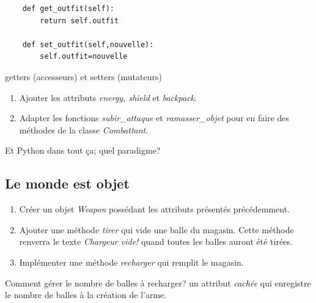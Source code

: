 \documentclass[a4paper,11pt]{article}
\begin{document}
\begin{Form}
\begin{lstlisting}
	def get_outfit(self):
		return self.outfit
	
	def set_outfit(self,nouvelle):
		self.outfit=nouvelle
\end{lstlisting}
\begin{commentprof}
getters (accesseurs) et setters (mutateurs)
\end{commentprof}
\begin{activite}
\begin{enumerate}
\item Ajouter les attributs \emph{energy, shield} et \emph{backpack}.
\item Adapter les fonctions \emph{subir\_attaque} et \emph{ramasser\_objet} pour en faire des méthodes de la classe \emph{Combattant}.
\end{enumerate}
\end{activite}
\begin{commentprof}
Et Python dans tout ça; quel paradigme?
\end{commentprof}
\subsection{Le monde est objet}
\begin{activite}
\begin{enumerate}
\item Créer un objet \emph{Weapon} possédant les attributs présentés précédemment.
\item Ajouter une méthode \emph{tirer} qui vide une balle du magasin. Cette méthode renverra le texte \emph{Chargeur vide!} quand toutes les balles auront été tirées.
\item Implémenter une méthode \emph{recharger} qui remplit le magasin.
\end{enumerate}
\end{activite}
\begin{commentprof}
Comment gérer le nombre de balles à recharger? un attribut \emph{cachée} qui enregistre le nombre de balles à la création de l'arme.
\end{commentprof}
\end{Form}
\end{document}
